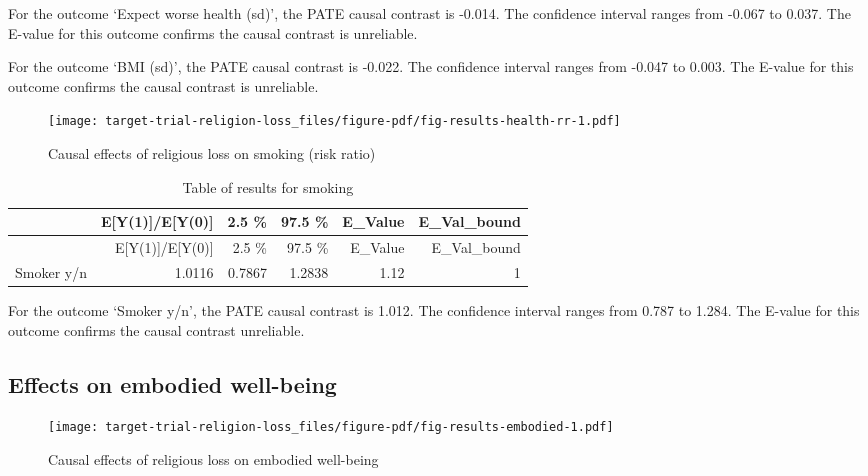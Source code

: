 \documentclass[
  singlecolumn]{report}
\begin{document}
For the outcome `Expect worse health (sd)', the PATE causal contrast is
-0.014. The confidence interval ranges from -0.067 to 0.037. The E-value
for this outcome confirms the causal contrast is unreliable.

For the outcome `BMI (sd)', the PATE causal contrast is -0.022. The
confidence interval ranges from -0.047 to 0.003. The E-value for this
outcome confirms the causal contrast is unreliable.

\begin{figure}

{\centering \texttt{[image: target-trial-religion-loss\_files/figure-pdf/fig-results-health-rr-1.pdf]}

}

\caption{\label{fig-results-health-rr}Causal effects of religious loss
on smoking (risk ratio)}

\end{figure}

\hypertarget{tbl-results-health-rr}{}
\begin{longtable}[]{@{}lrrrrr@{}}
\caption{\label{tbl-results-health-rr}Table of results for
smoking}\tabularnewline
\toprule\noalign{}
& E{[}Y(1){]}/E{[}Y(0){]} & 2.5 \% & 97.5 \% & E\_Value &
E\_Val\_bound \\
\midrule\noalign{}
\endfirsthead
\toprule\noalign{}
& E{[}Y(1){]}/E{[}Y(0){]} & 2.5 \% & 97.5 \% & E\_Value &
E\_Val\_bound \\
\midrule\noalign{}
\endhead
\bottomrule\noalign{}
\endlastfoot
Smoker y/n & 1.0116 & 0.7867 & 1.2838 & 1.12 & 1 \\
\end{longtable}

For the outcome `Smoker y/n', the PATE causal contrast is 1.012. The
confidence interval ranges from 0.787 to 1.284. The E-value for this
outcome confirms the causal contrast unreliable.

\hypertarget{effects-on-embodied-well-being}{%
\subsection{Effects on embodied
well-being}\label{effects-on-embodied-well-being}}

\begin{figure}

{\centering \texttt{[image: target-trial-religion-loss\_files/figure-pdf/fig-results-embodied-1.pdf]}

}

\caption{\label{fig-results-embodied}Causal effects of religious loss on
embodied well-being}

\end{figure}
\end{document}
